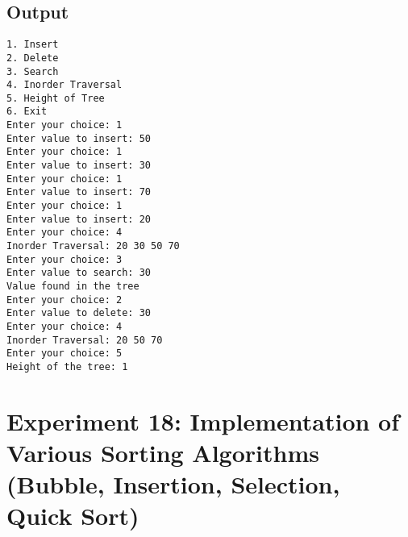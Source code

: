 \documentclass[12pt,a4paper]{article}
\begin{document}
\subsection*{Output}
\begin{tcolorbox}[terminalstyle, title=Sample Output]
\texttt{1. Insert\\2. Delete\\3. Search\\4. Inorder Traversal\\5. Height of Tree\\6. Exit\\
Enter your choice: 1\\
Enter value to insert: 50\\
Enter your choice: 1\\
Enter value to insert: 30\\
Enter your choice: 1\\
Enter value to insert: 70\\
Enter your choice: 1\\
Enter value to insert: 20\\
Enter your choice: 4\\
Inorder Traversal: 20 30 50 70\\
Enter your choice: 3\\
Enter value to search: 30\\
Value found in the tree\\
Enter your choice: 2\\
Enter value to delete: 30\\
Enter your choice: 4\\
Inorder Traversal: 20 50 70\\
Enter your choice: 5\\
Height of the tree: 1}
\end{tcolorbox}

\newpage
\section*{Experiment 18: Implementation of Various Sorting Algorithms (Bubble, Insertion, Selection, Quick Sort)}
\end{document}
